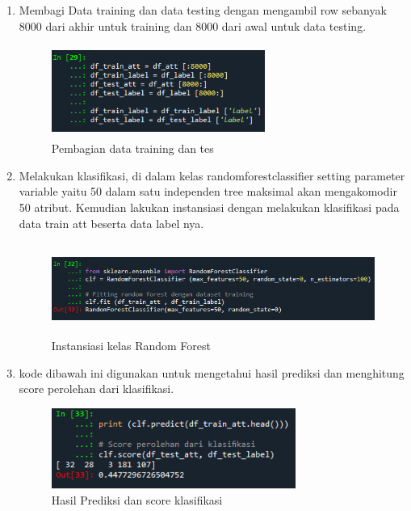 \begin{enumerate}
    \item Membagi Data training dan data testing dengan mengambil row sebanyak 8000 dari akhir untuk training dan 8000 dari awal untuk data testing.
    \begin{figure}[!htbp]
        \centering
        \includegraphics[width=7cm,height=3cm]{figures/df_train_test.png}
        \caption{Pembagian data training dan tes}
        \label{penanda}
    \end{figure}

    \item Melakukan klasifikasi, di dalam kelas randomforestclassifier setting parameter variable yaitu 50 dalam satu independen tree maksimal akan mengakomodir 50 atribut. Kemudian lakukan instansiasi dengan melakukan klasifikasi pada data train att beserta data label nya. 
    \begin{figure}[!htbp]
        \centering
        \includegraphics[width=14cm,height=3cm]{figures/instansiasi_rf.png}
        \caption{Instansiasi kelas Random Forest}
        \label{penanda}
    \end{figure}

    \item kode dibawah ini digunakan untuk mengetahui hasil prediksi dan menghitung score perolehan dari klasifikasi.
    \begin{figure}[!htbp]
        \centering
        \includegraphics[width=8cm,height=2 cm]{figures/score_rf.png}
        \caption{Hasil Prediksi dan score klasifikasi}
        \label{penanda}
    \end{figure}
    
\end{enumerate}

